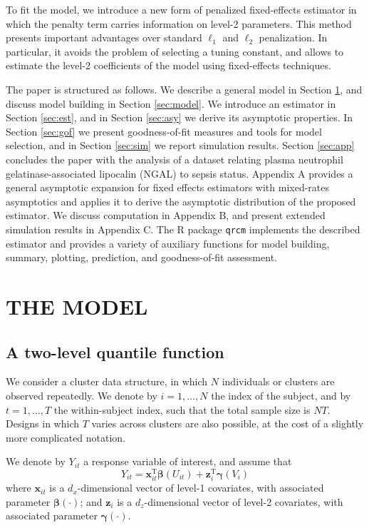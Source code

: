 \documentclass[12pt]{article}
\def\T{{ \mathrm{\scriptscriptstyle T} }}
\def\betavec{\bm{\beta}}
\def\gammavec{\bm{\gamma}}
\def\xx{\bm{x}}
\def\zz{\bm{z}}
\begin{document}
To fit the model, we introduce a new form of penalized fixed-effects estimator in which the penalty term
carries information on level-2 parameters. This method presents important advantages 
over standard $\ell_1$ and $\ell_2$ penalization. In particular, it avoids the problem of selecting a tuning constant,
and allows to estimate the level-2 coefficients of the model using fixed-effects techniques.


The paper is structured as follows. We describe a general model in Section \ref{sec:model0},
and discuss model building in Section \ref{sec:model}. We introduce an
estimator in Section \ref{sec:est}, and in Section \ref{sec:asy} we derive its asymptotic properties. 
In Section \ref{sec:gof} we present goodness-of-fit measures and tools for model selection,
and in Section \ref{sec:sim} we report simulation results. Section \ref{sec:app} concludes the paper with the analysis of 
a dataset relating plasma neutrophil gelatinase-associated lipocalin (NGAL) to sepsis status. Appendix A provides a general asymptotic expansion for fixed effects estimators with mixed-rates asymptotics and applies it to derive the asymptotic distribution of the proposed estimator.
We discuss computation in Appendix B, 
and present extended simulation results in Appendix C. The R package \texttt{qrcm} implements the described estimator
and provides a variety of auxiliary functions for model building, summary, plotting, prediction, and goodness-of-fit assessment.




\section{THE MODEL}\label{sec:model0}

\subsection{A two-level quantile function}
We consider a cluster data structure, in which $N$ individuals or clusters are observed repeatedly.
We denote by $i = 1, \ldots, N$ the index of the subject, and by $t = 1, \ldots, T$ the within-subject index,
such that the total sample size is $NT$. Designs in which $T$ varies across clusters are also possible,
at the cost of a slightly more complicated notation.

We denote by $Y_{it}$ a response variable of interest, and assume that
\begin{equation}\label{themodel}
Y_{it} = \xx_{it}^\T\betavec(U_{it}) + \zz_{i}^\T\gammavec(V_{i})
\end{equation}
where $\xx_{it}$ is a $d_x$-dimensional vector of level-1 covariates, with associated parameter $\betavec(\cdot)$;
and $\zz_i$ is a $d_z$-dimensional vector of level-2 covariates, with associated parameter $\gammavec(\cdot)$.
\end{document}
